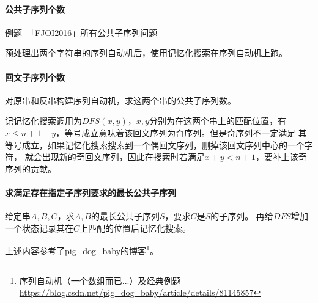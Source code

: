 \paragraph{公共子序列个数}
例题~「FJOI2016」所有公共子序列问题

预处理出两个字符串的序列自动机后，使用记忆化搜索在序列自动机上跑。
\paragraph{回文子序列个数}
对原串和反串构建序列自动机，求这两个串的公共子序列数。

记记忆化搜索调用为$DFS(x,y)$，$x,y$分别为在这两个串上的匹配位置，有
$x\leq n+1-y$，等号成立意味着该回文序列为奇序列。但是奇序列不一定满足
其等号成立，如果记忆化搜索搜索到一个偶回文序列，删掉该回文序列中心的一个字符，
就会出现新的奇回文序列，因此在搜索时若满足$x+y<n+1$，要补上该奇序列的贡献。
\paragraph{求满足存在指定子序列要求的最长公共子序列}
给定串$A,B,C$，求$A,B$的最长公共子序列$S$，要求$C$是$S$的子序列。
再给$DFS$增加一个状态记录其在$C$上匹配的位置后记忆化搜索。

上述内容参考了pig\_dog\_baby的博客\footnote{
    序列自动机（一个数组而已...）及经典例题
    \url{https://blog.csdn.net/pig\_dog\_baby/article/details/81145857}
}。
